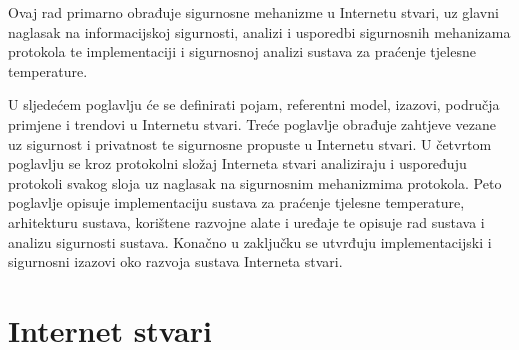 \documentclass[times, utf8, diplomski]{fer}
\begin{document}
Ovaj rad primarno obrađuje sigurnosne mehanizme u Internetu stvari, uz glavni naglasak na informacijskoj sigurnosti, analizi i usporedbi sigurnosnih mehanizama protokola te implementaciji i sigurnosnoj analizi sustava za praćenje tjelesne temperature. 

U sljedećem poglavlju će se definirati pojam, referentni model, izazovi, područja primjene i trendovi u Internetu stvari. Treće poglavlje obrađuje zahtjeve vezane uz sigurnost i privatnost te sigurnosne propuste u Internetu stvari. U četvrtom poglavlju se kroz protokolni složaj Interneta stvari analiziraju i uspoređuju protokoli svakog sloja uz naglasak na sigurnosnim mehanizmima protokola. Peto poglavlje opisuje implementaciju sustava za praćenje tjelesne temperature, arhitekturu sustava, korištene razvojne alate i uređaje te opisuje rad sustava i analizu sigurnosti sustava. Konačno u zaključku se utvrđuju implementacijski i sigurnosni izazovi oko razvoja sustava Interneta stvari.

\chapter{Internet stvari}
\end{document}
